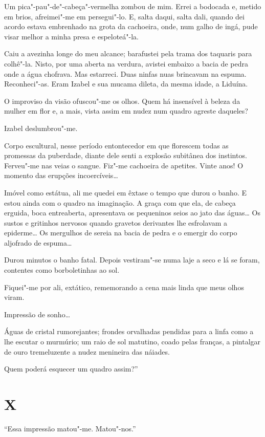 Um pica"-pau"-de"-cabeça"-vermelha zombou de mim. Errei a bodocada e, metido
em brios, afreimei"-me em persegui"-lo. E, salta daqui, salta dali, quando
dei acordo estava embrenhado na grota da cachoeira, onde, num galho de
ingá, pude visar melhor a minha presa e espeloteá"-la.

Caiu a avezinha longe do meu alcance; barafustei pela trama dos taquaris
para colhê"-la. Nisto, por uma aberta na verdura, avistei embaixo a bacia
de pedra onde a água chofrava. Mas estarreci. Duas ninfas nuas brincavam
na espuma. Reconheci"-as. Eram Izabel e sua mucama dileta, da mesma
idade, a Liduína.

O improviso da visão ofuscou"-me os olhos. Quem há insensível à beleza da
mulher em flor e, a mais, vista assim em nudez num quadro agreste
daqueles?

Izabel deslumbrou"-me.

Corpo escultural, nesse período entontecedor em que florescem todas as
promessas da puberdade, diante dele senti a explosão subitânea dos
instintos. Ferveu"-me nas veias o sangue. Fiz"-me cachoeira de apetites.
Vinte anos! O momento das erupções incoercíveis\ldots{}

Imóvel como estátua, ali me quedei em êxtase o tempo que durou o banho.
E estou ainda com o quadro na imaginação. A graça com que ela, de cabeça
erguida, boca entreaberta, apresentava os pequeninos seios ao jato das
águas\ldots{} Os sustos e gritinhos nervosos quando gravetos derivantes lhe
esfrolavam a epiderme\ldots{} Os mergulhos de sereia na bacia de pedra e o
emergir do corpo aljofrado de espuma\ldots{}

Durou minutos o banho fatal. Depois vestiram"-se numa laje a seco e lá se
foram, contentes como borboletinhas ao sol.

Fiquei"-me por ali, extático, rememorando a cena mais linda que meus
olhos viram.

Impressão de sonho\ldots{}

Águas de cristal rumorejantes; frondes orvalhadas pendidas para a linfa
como a lhe escutar o murmúrio; um raio de sol matutino, coado pelas
franças, a pintalgar de ouro tremeluzente a nudez menineira das náiades.

Quem poderá esquecer um quadro assim?''

\section*{X}

``Essa impressão matou"-me. Matou"-nos.''

